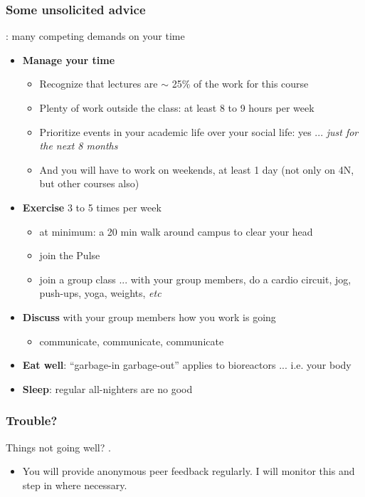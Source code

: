 \begin{frame}\frametitle{Some unsolicited advice}
	\begin{exampleblock}{}
		{} : many competing demands on your time
	\end{exampleblock}
	\begin{itemize}
		\item	\textbf{Manage your time}
		\begin{itemize}
			\item	Recognize that lectures are $\sim$ 25\% of the work for this course
			\item	Plenty of work outside the class: at least 8 to 9 hours per week
			\item	Prioritize events in your academic life over your social life: yes ... \emph{just for the next 8 months}
			\item	And you will have to work on weekends, at least 1 day (not only on 4N, but other courses also)
		\end{itemize}
		\pause
		\item	\textbf{Exercise} 3 to 5 times per week
		\begin{itemize}
			\item	at minimum: a 20 min walk around campus to clear your head
			\item	join the Pulse
			\item	join a group class ... with your group members, do a cardio circuit, jog, push-ups, yoga, weights, \emph{etc}
		\end{itemize}
		\pause
		\item	\textbf{Discuss} with your group members how you work is going
		\begin{itemize}
			\item	communicate, communicate, communicate
		\end{itemize}
		\item	\textbf{Eat well}: ``garbage-in garbage-out'' applies to bioreactors ... i.e. your body
		\item	\textbf{Sleep}: regular all-nighters are no good
	\end{itemize}
\end{frame}

\begin{frame}\frametitle{Trouble?}
	\begin{exampleblock}{}
		\vspace{12pt}
		Things not going well? {}.
		\vspace{12pt}
	\end{exampleblock}
	\begin{itemize}
		\item	You will provide anonymous peer feedback regularly. I will monitor this and step in where necessary.
	\end{itemize}
\end{frame}

